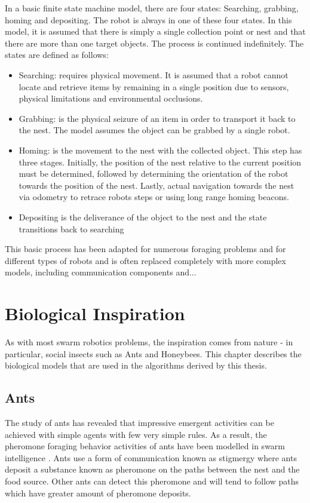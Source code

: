 In a basic finite state machine model, there are four states: Searching, grabbing, homing and depositing. The robot is always in one of these four states. In this model, it is assumed that there is simply a single collection point or nest and that there are more than one target objects. The process is continued indefinitely. The states are defined as follows:

\begin{itemize}
\item Searching: requires physical movement. It is assumed that a robot cannot locate and retrieve items by remaining in a single position due to sensors, physical limitations and environmental occlusions.
\item Grabbing: is the physical seizure of an item in order to transport it back to the nest. The model assumes the object can be grabbed by a single robot.
\item Homing: is the movement to the nest with the collected object. This step has three stages. Initially, the position of the nest relative to the current position must be determined, followed by determining the orientation of the robot towards the position of the nest. Lastly, actual navigation towards the nest via odometry to retrace robots steps or using long range homing beacons. 
\item Depositing is the deliverance of the object to the nest and the state transitions back to searching 
\end{itemize}

This basic process has been adapted for numerous foraging problems and for different types of robots and is often replaced completely with more complex models, including communication components and... %

\section{Biological Inspiration}

As with most swarm robotics problems, the inspiration comes from nature - in particular, social insects such as Ants and Honeybees. This chapter describes the biological models that are used in the algorithms derived by this thesis. 

\label{sec:second:biological}

\subsection{Ants}
The study of ants has revealed that impressive emergent activities can be achieved with  simple agents with few very simple rules. As a result, the pheromone foraging behavior activities of ants have been modelled in swarm intelligence \cite{dorigo2006ant, dorigo2010ant}. Ants use a form of communication known as stigmergy \cite{} where ants deposit a substance known as pheromone on the paths between the nest and the food source. Other ants can detect this pheromone and will tend to follow paths which have greater amount of pheromone deposits. 

